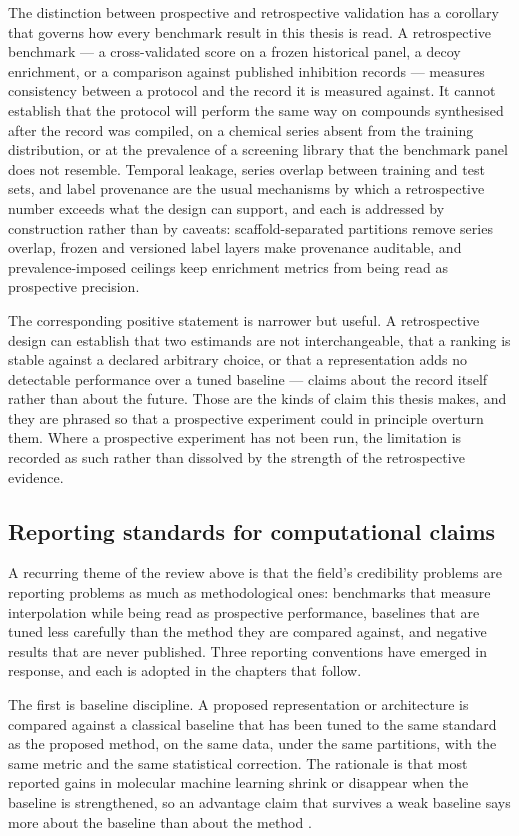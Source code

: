 The distinction between prospective and retrospective validation has a corollary that governs how every benchmark result in this thesis is read. A retrospective benchmark --- a cross-validated score on a frozen historical panel, a decoy enrichment, or a comparison against published inhibition records --- measures consistency between a protocol and the record it is measured against. It cannot establish that the protocol will perform the same way on compounds synthesised after the record was compiled, on a chemical series absent from the training distribution, or at the prevalence of a screening library that the benchmark panel does not resemble. Temporal leakage, series overlap between training and test sets, and label provenance are the usual mechanisms by which a retrospective number exceeds what the design can support, and each is addressed by construction rather than by caveats: scaffold-separated partitions remove series overlap, frozen and versioned label layers make provenance auditable, and prevalence-imposed ceilings keep enrichment metrics from being read as prospective precision.

The corresponding positive statement is narrower but useful. A retrospective design can establish that two estimands are not interchangeable, that a ranking is stable against a declared arbitrary choice, or that a representation adds no detectable performance over a tuned baseline --- claims about the record itself rather than about the future. Those are the kinds of claim this thesis makes, and they are phrased so that a prospective experiment could in principle overturn them. Where a prospective experiment has not been run, the limitation is recorded as such rather than dissolved by the strength of the retrospective evidence.

\subsection{Reporting standards for computational claims}

A recurring theme of the review above is that the field's credibility problems are reporting problems as much as methodological ones: benchmarks that measure interpolation while being read as prospective performance, baselines that are tuned less carefully than the method they are compared against, and negative results that are never published. Three reporting conventions have emerged in response, and each is adopted in the chapters that follow.

The first is baseline discipline. A proposed representation or architecture is compared against a classical baseline that has been tuned to the same standard as the proposed method, on the same data, under the same partitions, with the same metric and the same statistical correction. The rationale is that most reported gains in molecular machine learning shrink or disappear when the baseline is strengthened, so an advantage claim that survives a weak baseline says more about the baseline than about the method \cite{CarracedoReboredo2021}.


